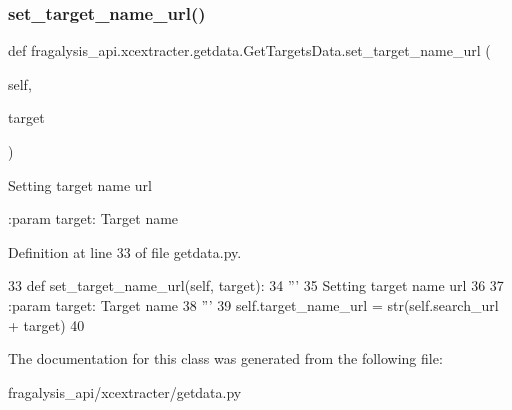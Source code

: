 \subsubsection{\texorpdfstring{set\+\_\+target\+\_\+name\+\_\+url()}{set\_target\_name\_url()}}
{\footnotesize\ttfamily def fragalysis\+\_\+api.\+xcextracter.\+getdata.\+Get\+Targets\+Data.\+set\+\_\+target\+\_\+name\+\_\+url (\begin{DoxyParamCaption}\item[{}]{self,  }\item[{}]{target }\end{DoxyParamCaption})}

\begin{DoxyVerb}Setting target name url

:param target: Target name
\end{DoxyVerb}
 

Definition at line 33 of file getdata.\+py.


\begin{DoxyCode}
33     \textcolor{keyword}{def }set\_target\_name\_url(self, target):
34         \textcolor{stringliteral}{'''}
35 \textcolor{stringliteral}{        Setting target name url}
36 \textcolor{stringliteral}{}
37 \textcolor{stringliteral}{        :param target: Target name}
38 \textcolor{stringliteral}{        '''}
39         self.target\_name\_url = str(self.search\_url + target)
40 
\end{DoxyCode}


The documentation for this class was generated from the following file\+:\begin{DoxyCompactItemize}
\item 
fragalysis\+\_\+api/xcextracter/getdata.\+py\end{DoxyCompactItemize}
